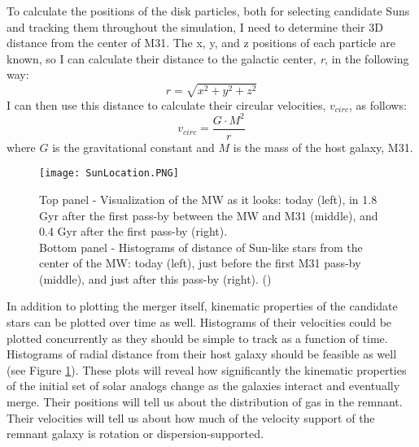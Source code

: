 \documentclass{aastex63}
\begin{document}
To calculate the positions of the disk particles, both for selecting candidate Suns and tracking them throughout the simulation, I need to determine their 3D distance from the center of M31. The x, y, and z positions of each particle are known, so I can calculate their distance to the galactic center, \textit{r}, in the following way:
\begin{equation}
    r = \sqrt{x^{2}+y^{2}+z^{2}}
\end{equation}
I can then use this distance to calculate their circular velocities, $v_{circ}$, as follows:
\begin{equation}
    v_{circ} = \frac{G\cdot M^{2}}{r}
\end{equation}
where $G$ is the gravitational constant and $M$ is the mass of the host galaxy, M31.

\begin{figure}[h!]
    \centering
    \texttt{[image: SunLocation.PNG]}
    \caption{Top panel - Visualization of the MW as it looks: today (left), in 1.8 Gyr after the first pass-by between the MW and M31 (middle), and 0.4 Gyr after the first pass-by (right).\\ Bottom panel - Histograms of distance of Sun-like stars from the center of the MW: today (left), just before the first M31 pass-by (middle), and just after this pass-by (right). (\cite{2008MNRAS.386..461C})}
    \label{fig:sunlocation}
\end{figure}

In addition to plotting the merger itself, kinematic properties of the candidate stars can be plotted over time as well. Histograms of their velocities could be plotted concurrently as they should be simple to track as a function of time. Histograms of radial distance from their host galaxy should be feasible as well (see Figure \ref{fig:sunlocation}). These plots will reveal how significantly the kinematic properties of the initial set of solar analogs change as the galaxies interact and eventually merge. Their positions will tell us about the distribution of gas in the remnant. Their velocities will tell us about how much of the velocity support of the remnant galaxy is rotation or dispersion-supported.
\end{document}
